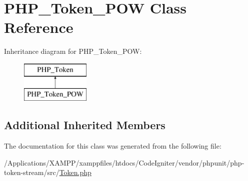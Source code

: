 \hypertarget{class_p_h_p___token___p_o_w}{}\section{P\+H\+P\+\_\+\+Token\+\_\+\+P\+OW Class Reference}
\label{class_p_h_p___token___p_o_w}
Inheritance diagram for P\+H\+P\+\_\+\+Token\+\_\+\+P\+OW\+:\begin{figure}[H]
\begin{center}
\leavevmode
\includegraphics[height=2.000000cm]{class_p_h_p___token___p_o_w}
\end{center}
\end{figure}
\subsection*{Additional Inherited Members}


The documentation for this class was generated from the following file\+:\begin{DoxyCompactItemize}
\item 
/\+Applications/\+X\+A\+M\+P\+P/xamppfiles/htdocs/\+Code\+Igniter/vendor/phpunit/php-\/token-\/stream/src/\mbox{\hyperlink{_token_8php}{Token.\+php}}\end{DoxyCompactItemize}
